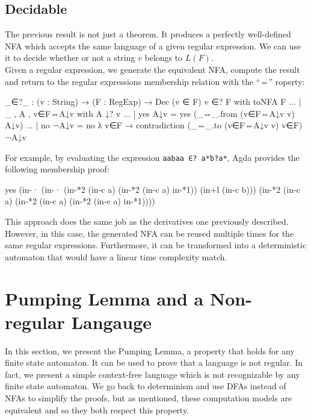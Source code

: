 \subsection{Decidable}
The previous result is not just a theorem. It produces a perfectly well-defined NFA which accepts the same language of a given regular expression. We can use it to decide whether or not a string $v$ belongs to $L(F)$.\\
Given a regular expression, we generate the equivalent NFA, compute the result and return to the regular expressions membership relation with the ``⇔'' roperty:
\begin{agda}
_∈?_ : (v : String) → (F : RegExp) → Dec (v ∈ F)
v ∈? F with toNFA F
... | _ , A , v∈F⇔A↓v with A ↓? v
... | yes A↓v = yes (_⇔_.from (v∈F⇔A↓v v) A↓v)
... | no ¬A↓v = 
  no λ v∈F → contradiction (_⇔_.to (v∈F⇔A↓v v) v∈F) ¬A↓v
\end{agda}
For example, by evaluating the expression \texttt{aabaa ∈? a*b?a*}, Agda provides the following membership proof: 
\begin{agda}
yes
  (in-·
     (in-· (in-*2 (in-c a) (in-*2 (in-c a) in-*1)) 
       (in+l (in-c b)))
     (in-*2 (in-c a) 
       (in-*2 (in-c a) (in-*2 (in-c a) in-*1))))
\end{agda}
This approach does the same job as the derivatives one previously described. However, in this case, the generated NFA can be reused multiple times for the same regular expressions. Furthermore, it can be transformed into a deterministic automaton that would have a linear time complexity match.


\section{Pumping Lemma and a Non-regular Langauge}
In this section, we present the Pumping Lemma, a property that holds for any finite state automaton. It can be used to prove that a language is not regular. In fact, we present a simple context-free language which is not recognizable by any finite state automaton. We go back to determinism and use DFAs instead of NFAs to simplify the proofs, but as mentioned, these computation models are equivalent and so they both respect this property.


